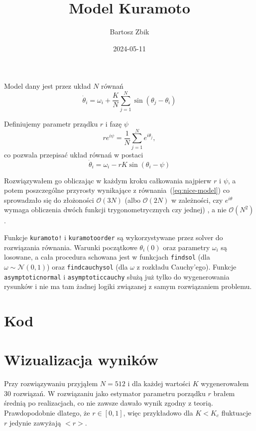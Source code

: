 \documentclass[12pt]{article}
\title{Model Kuramoto}
\author{Bartosz Zbik}
\date{2024-05-11} %
\begin{document}
\maketitle %

Model dany jest przez układ $N$ równań
\begin{equation}
\dot \theta_i = \omega_i + \frac{K}{N} \sum_{j=1}^N \sin (\theta_j - \theta_i)
\end{equation}

Definiujemy parametr prządku $r$ i fazę $\psi$
\begin{equation}
r e^{i\psi} = \frac{1}{N} \sum_{j=1}^N e^{i\theta_j},
\end{equation}
co pozwala przepisać układ równań w postaci
\begin{equation}
\label{eq:nice-model}
\dot \theta_i = \omega_i - r K \sin (\theta_i - \psi)
\end{equation}

Rozwiązywałem go obliczając w każdym kroku całkowania najpierw $r$ i $\psi$, a potem poszczególne przyrosty wynikające z równania~(\ref{eq:nice-model}) co sprowadzało się do złożoności $\mathcal{O}(3N)$ (albo $\mathcal{O}(2N)$ w zależności, czy $e^{i\theta}$ wymaga obliczenia dwóch funkcji trygonometrycznych czy jednej) , a nie $\mathcal{O}(N^2)$.

Funkcje \texttt{kuramoto!} i \texttt{kuramotoorder} są wykorzystywane przez solver do rozwiązania równania.
Warunki początkowe $\theta_i(0)$ oraz parametry $\omega_i$ są losowane, a cała procedura schowana jest w funkcjach \texttt{findsol} (dla $\omega \sim \mathcal{N}(0,1)$) oraz \texttt{findcauchysol} (dla $\omega$ z rozkładu Cauchy'ego).
Funkcje \texttt{asymptoticnormal} i \texttt{asymptoticcauchy} służą już tylko do wygenerowania rysunków i nie ma tam żadnej logiki związanej z samym rozwiązaniem problemu.


\section{Kod}
\clearpage


\section{Wizualizacja wyników}
Przy rozwiązywaniu przyjąłem $N=512$ i dla każdej wartości $K$ wygenerowałem 30 rozwiązań. 
W rozwiązaniu jako estymator parametru porządku $r$ brałem średnią po realizacjach, co nie zawsze dawało wynik zgodny z teorią. 
Prawdopodobnie dlatego, że $r \in [0,1]$, więc przykładowo dla $K < K_c$ fluktuacje $r$ jedynie zawyżają $<r>$.
\end{document}
